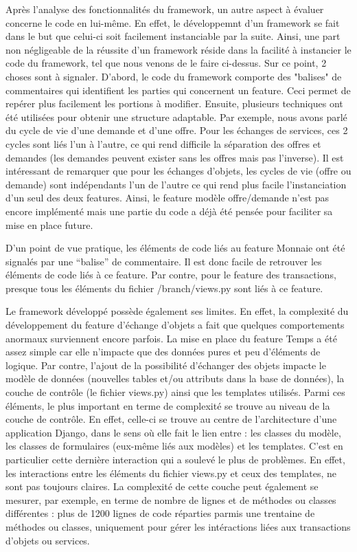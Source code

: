 {\begin{description}
Après l'analyse des fonctionnalités du framework,  un autre aspect à évaluer concerne le code en lui-même.  En effet,  le développemnt d'un framework se fait dans le but que celui-ci soit facilement instanciable par la suite.  Ainsi,  une part non négligeable de la réussite d'un framework réside dans la facilité à instancier le code du framework,  tel que nous venons de le faire ci-dessus.  Sur ce point,  2 choses sont à signaler.  D'abord,  le code du framework comporte des "balises" de commentaires qui identifient les parties qui concernent un feature.  Ceci permet de repérer plus facilement les portions à modifier.  Ensuite,  plusieurs techniques ont été utilisées pour obtenir une structure adaptable.  Par exemple,  nous avons parlé du cycle de vie d'une demande et d'une offre.  Pour les échanges de services,  ces 2 cycles sont liés l'un à l'autre,  ce qui rend difficile la séparation des offres et demandes (les demandes peuvent exister sans les offres mais pas l'inverse).  Il est intéressant de remarquer que pour les échanges d'objets,  les cycles de vie (offre ou demande) sont indépendants l'un de l'autre ce qui rend plus facile l'instanciation d'un seul des deux features.  Ainsi,  le feature modèle offre/demande n'est pas encore implémenté mais une partie du code a déjà été pensée pour faciliter sa mise en place future.

D'un point de vue pratique,  les éléments de code liés au feature Monnaie ont été signalés par une ``balise'' de commentaire.  Il est donc facile de retrouver les éléments de code liés à ce feature.  Par contre,  pour le feature des transactions,  presque tous les éléments du fichier /branch/views.py sont liés à ce feature.  

\item[Limitations] Le framework développé possède également ses limites.  En effet,  la complexité du développement du feature d'échange d'objets a fait que quelques comportements anormaux surviennent encore parfois.  La mise en place du feature Temps a été assez simple car elle n'impacte que des données pures et peu d'éléments de logique.  Par contre,  l'ajout de la possibilité d'échanger des objets impacte le modèle de données (nouvelles tables et/ou attributs dans la base de données),  la couche de contrôle (le fichier views.py) ainsi que les templates utilisés.  Parmi ces éléments,  le plus important en terme de complexité se trouve au niveau de la couche de contrôle.  En effet,  celle-ci se trouve au centre de l'architecture d'une application Django,  dans le sens où elle fait le lien entre : les classes du modèle,  les classes de formulaires (eux-même liés aux modèles) et les templates.  C'est en particulier cette dernière interaction qui a soulevé le plus de problèmes.  En effet,  les interactions entre les éléments du fichier views.py et ceux des templates,  ne sont pas toujours claires.  La complexité de cette couche peut également se mesurer,  par exemple,  en terme de nombre de lignes et de méthodes ou classes différentes : plus de 1200 lignes de code réparties parmis une trentaine de méthodes ou classes,  uniquement pour gérer les intéractions liées aux transactions d'objets ou services.



\end{description}}
